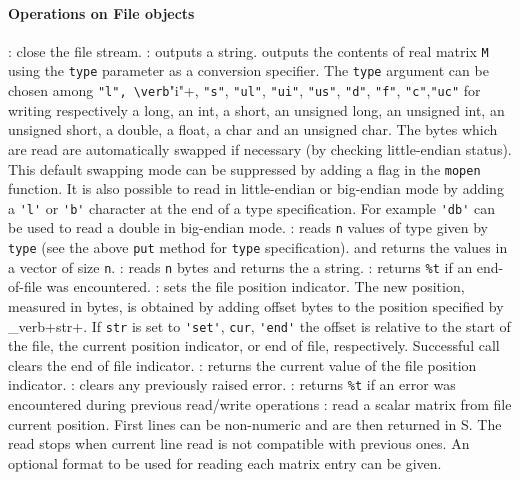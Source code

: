 \paragraph{Operations on File objects}
\begin{itemize}
  : close the file stream.
  : outputs a string. 
   outputs the contents of real matrix \verb+M+ using 
  the \verb!type! parameter as a conversion specifier. The \verb+type+ argument can be chosen 
  among \verb+"l", \verb+"i"+, \verb+"s"+, \verb+"ul"+, \verb+"ui"+, \verb+"us"+, \verb+"d"+, \verb+"f"+, 
  \verb+"c"+,\verb+"uc"+ for writing respectively a long, an int, a short, an unsigned long, 
  an unsigned int, an unsigned short, a double, a float, a char and an unsigned char. 
  The bytes which are read are automatically swapped if necessary (by checking little-endian status). 
  This default swapping mode can be suppressed by adding a flag in the \verb!mopen! function. 
  It is also possible to read in little-endian or big-endian mode  by adding a \verb+'l'+ or \verb+'b'+  
  character at the end of a type specification. For example \verb+'db'+ can be used to read a double 
  in big-endian mode. 
  : reads \verb+n+ values of type given by \verb+type+ 
  (see the above \verb+put+ method for \verb+type+ specification).
  and returns the values in a vector of size \verb+n+. 
  : reads \verb+n+ bytes and returns the a string.
  : returns \verb+%t+ if an end-of-file was encountered. 
  :  sets  the  file  position indicator. The new position, 
  measured in bytes, is obtained by adding offset bytes to  the
  position  specified by _verb+str+. If \verb+str+ is set to \verb+'set'+, \verb+cur+, 
  \verb+'end'+ the offset is relative to the start of the file, 
  the current position indicator, or  end of file,  respectively. 
  Successful call clears the end of file indicator.
  : returns the current value of the file position indicator. 
  : clears any previously raised error.
  : returns \verb+%t+ if an error was encountered during previous read/write 
  operations 
  : read a scalar matrix from file current position. 
  First lines can be non-numeric and are then returned in S. The read stops when current 
  line read is not compatible with previous ones. An optional format to be used for reading
  each matrix entry can be given. 

\end{itemize}
